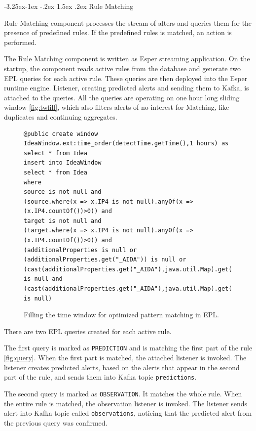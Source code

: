 \documentclass[a4paper]{article} %
\makeatletter
\renewcommand\subsection{\@startsection{subsection}{2}{\z@}%
                   {-3.25ex\@plus -1ex \@minus -.2ex}%
                   {1.5ex \@plus .2ex}%
                   {\normalfont\sffamily\large\bfseries\color{projectcolor}}}
\makeatother
\begin{document}
\subsection{Rule Matching}

Rule Matching component processes the stream of alters and queries them for the presence of predefined rules.
If the predefined rules is matched, an action is performed.

The Rule Matching component is written as Esper streaming application.
On the startup, the component reads active rules from the database and generate two EPL queries for each active rule.
These queries are then deployed into the Esper runtime engine. Listener, creating predicted alerts and sending them
to Kafka, is attached to the queries. All the queries are operating on one hour long sliding window
\autoref{fig:twfill}, which also filters alerts of no interest for Matching, like duplicates and continuing aggregates.


\begin{figure}[h!]
\begin{lstlisting}[]
@public create window IdeaWindow.ext:time_order(detectTime.getTime(),1 hours) as select * from Idea
insert into IdeaWindow
select * from Idea
where
source is not null and
(source.where(x => x.IP4 is not null).anyOf(x => (x.IP4.countOf())>0)) and
target is not null and
(target.where(x => x.IP4 is not null).anyOf(x => (x.IP4.countOf())>0)) and
(additionalProperties is null or (additionalProperties.get("_AIDA")) is null or
(cast(additionalProperties.get("_AIDA"),java.util.Map).get("Duplicate")) is null and
(cast(additionalProperties.get("_AIDA"),java.util.Map).get("Continuing")) is null)
\end{lstlisting}
\caption{Filling the time window for optimized pattern matching in EPL.}
\label{fig:twfill}
\end{figure}

There are two EPL queries created for each active rule.

The first query is marked as \texttt{PREDICTION} and is matching the first part of the rule \autoref{fig:query}.
When the first part is matched, the attached listener is invoked. The listener creates predicted alerts, based
on the alerts that appear in the second part of the rule, and sends them into Kafka topic \texttt{predictions}.

The second query is marked as \texttt{OBSERVATION}. It matches the whole rule. When the entire rule is matched,
the observation listener is invoked. The listener sends alert into Kafka topic called \texttt{observations},
noticing that the predicted alert from the previous query was confirmed.
\end{document}
